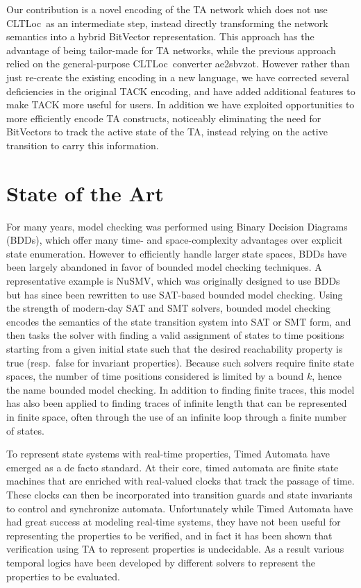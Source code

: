 \documentclass[a4paper,11pt]{report}
\theoremstyle{definition}
\newcommand{\cltloc}{CLTLoc}
\newcommand{\aez}{ae2sbvzot}
\begin{document}
Our contribution is a novel encoding of the TA network which does not use
\cltloc\ as an intermediate step, instead directly transforming the network
semantics into a hybrid BitVector representation. This approach has the
advantage of being tailor-made for TA networks, while the previous approach
relied on the general-purpose \cltloc\ converter \aez. However rather than just
re-create the existing encoding in a new language, we have corrected several
deficiencies in the original TACK encoding, and have added additional features
to make TACK more useful for users. In addition we have exploited opportunities
to more efficiently encode TA constructs, noticeably eliminating the need for
BitVectors to track the active state of the TA, instead relying on the active
transition to carry this information.

\chapter{State of the Art}\label{stateoftheart}


For many years, model checking was performed using Binary Decision Diagrams
(BDDs)\cite{bryant86}, which offer many time- and space-complexity advantages
over explicit state enumeration\cite{burch92}. However to efficiently handle
larger state spaces, BDDs have been largely abandoned in favor of bounded model
checking techniques. A representative example is NuSMV\cite{cimatti02}, which
was originally designed to use BDDs but has since been rewritten to use
SAT-based bounded model checking. Using the strength of modern-day SAT and SMT
solvers, bounded model checking encodes the semantics of the state transition
system into SAT or SMT form, and then tasks the solver with finding a valid
assignment of states to time positions starting from a given initial state such
that the desired reachability property is true (resp.\ false for invariant
properties). Because such solvers require finite state spaces, the number of
time positions considered is limited by a bound $k$, hence the name bounded
model checking. In addition to finding finite traces, this model has also been
applied to finding traces of infinite length that can be represented in finite
space, often through the use of an infinite loop through a finite number of
states.

To represent state systems with real-time properties, Timed Automata have
emerged as a de facto standard\cite{alur94}. At their core, timed automata are
finite state machines that are enriched with real-valued clocks that track the
passage of time. These clocks can then be incorporated into transition guards
and state invariants to control and synchronize automata. Unfortunately while
Timed Automata have had great success at modeling real-time systems, they have
not been useful for representing the properties to be verified, and in fact it
has been shown that verification using TA to represent properties is
undecidable\cite{alur94}. As a result various temporal logics have been
developed by different solvers to represent the properties to be evaluated.
\end{document}
